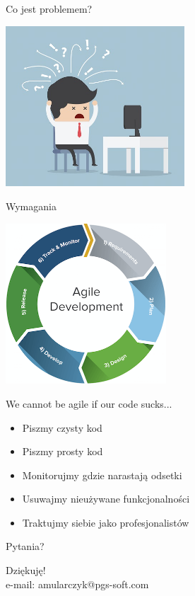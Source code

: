 \documentclass{beamer}
\begin{document}
\begin{frame}{Co jest problemem?}
\begin{center}
  	\includegraphics[height=6cm]{problem.jpg}
\end{center}
\end{frame}

\begin{frame}{}
\begin{center}
\Huge{Wymagania}
\end{center}
\end{frame}

\begin{frame}{}
\begin{center}
  	\includegraphics[height=6cm]{agile.png}
\end{center}
\end{frame}

\begin{frame}{}
\begin{center}
{\color{red}\Large{We cannot be agile if our code sucks...}}
\end{center}
\end{frame}

\begin{frame}{}
     \begin{Large}
	\begin{itemize}
		\item Piszmy czysty kod
		\item Piszmy prosty kod
		\item Monitorujmy gdzie narastają odsetki
		\item Usuwajmy nieużywane funkcjonalności
		\item Traktujmy siebie jako profesjonalistów
	\end{itemize}
     \end{Large}
\end{frame}


\begin{frame}{Pytania?}
\begin{center}
\Huge{Dziękuję!}\\
\Large{e-mail: amularczyk@pgs-soft.com}
\end{center}
\end{frame}
\end{document}
